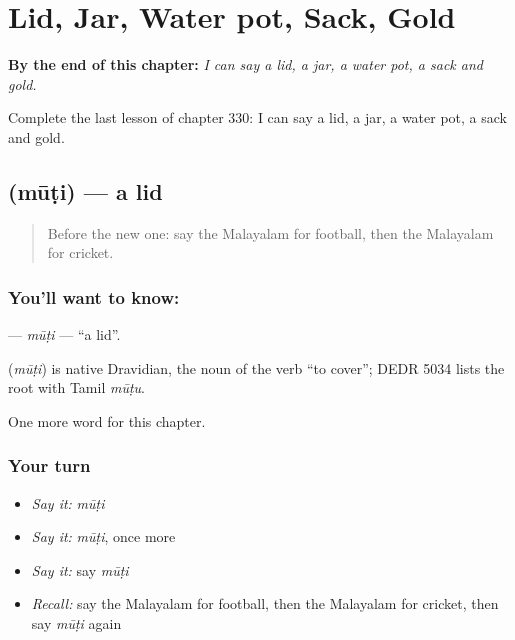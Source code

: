 
\chapter{Lid, Jar, Water pot, Sack, Gold}
\label{ch:ml-lid-jar-water-pot-sack-gold}

\begin{chapteropening}
\textbf{By the end of this chapter:} \emph{I can say a lid, a jar, a water pot, a sack and gold.}

Complete the last lesson of chapter 330: I can say a lid, a jar, a water pot, a sack and gold.
\end{chapteropening}

\section[\texorpdfstring{\ml{മൂടി} (mūṭi)}{മൂടി (mūṭi)}]{ (mūṭi) — a lid}

\label{lesson:ML-C330-muti}



\begin{quote}
Before the new one: say the Malayalam for football, then the Malayalam for cricket.
\end{quote}

\subsection*{You'll want to know: }
\textbf{} — \emph{mūṭi} — \textquotedblleft{}a lid\textquotedblright{}.

\begin{cousinweb}
\textbf{} (\emph{mūṭi}) is native Dravidian, the noun of the verb \textquotedblleft{}to cover\textquotedblright{}; DEDR 5034 lists the root with Tamil \emph{mūṭu}.
\end{cousinweb}

\begin{grammarlens}[title={What you've built}]
One more word for this chapter.
\end{grammarlens}

\subsection*{Your turn}
\begin{itemize}
\raggedright
  \item \emph{Say it:} \emph{mūṭi}
  \item \emph{Say it:} \emph{mūṭi}, once more
  \item \emph{Say it:} say \emph{mūṭi}
  \item \emph{Recall:} say the Malayalam for football, then the Malayalam for cricket, then say \emph{mūṭi} again
\end{itemize}

